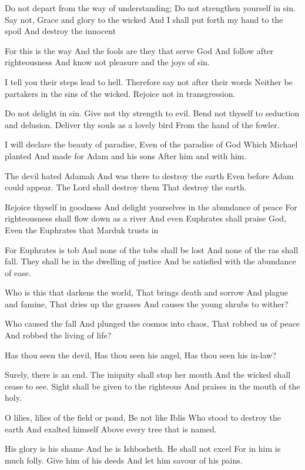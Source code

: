 \documentclass[
]{book}
\begin{document}
Do not depart from the way of understanding;
Do not strengthen yourself in sin.
Say not, Grace and glory to the wicked
And I shall put forth my hand to the spoil
And destroy the innocent

For this is the way
And the fools are they that serve God
And follow after righteousness
And know not pleasure and the joys of sin.

I tell you their steps lead to hell.
Therefore say not after their words
Neither be partakers in the sins of the wicked.
Rejoice not in transgression.

Do not delight in sin.
Give not thy strength to evil.
Bend not thyself to seduction and delusion.
Deliver thy souls as a lovely bird
From the hand of the fowler.

I will declare the beauty of paradise,
Even of the paradise of God
Which Michael planted
And made for Adam and his sons
After him and with him.

The devil hated Adamah
And was there to destroy the earth
Even before Adam could appear.
The Lord shall destroy them
That destroy the earth.

Rejoice thyself in goodness
And delight yourselves in the abundance of peace
For righteousness shall flow down as a river
And even Euphrates shall praise God,
Even the Euphrates that Marduk trusts in

For Euphrates is tob
And none of the tobs shall be lost
And none of the ras shall fall.
They shall be in the dwelling of justice
And be satisfied with the abundance of ease.

Who is this that darkens the world,
That brings death and sorrow
And plague and famine,
That dries up the grasses
And causes the young shrubs to wither?

Who caused the fall
And plunged the cosmos into chaos,
That robbed us of peace
And robbed the living of life?

Has thou seen the devil,
Has thou seen his angel,
Has thou seen his in-law?

Surely, there is an end.
The iniquity shall stop her mouth
And the wicked shall cease to see.
Sight shall be given to the righteous
And praises in the mouth of the holy.

O lilies, lilies of the field or pond,
Be not like Iblis
Who stood to destroy the earth
And exalted himself
Above every tree that is named.

His glory is his shame
And he is Ishbosheth.
He shall not excel
For in him is much folly.
Give him of his deeds
And let him savour of his pains.
\end{document}

